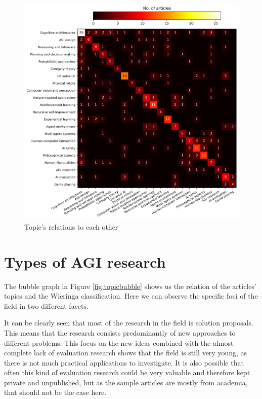 \documentclass[utf8,english]{gradu3}
\begin{document}
\begin{figure}[H]
  \centering
  \includegraphics[scale=0.65]{material/data/topic_heatmap_no_zeroes.png}
  \caption{Topic's relations to each other}
  \label{fig:topicheat}
\end{figure}


\section{Types of AGI research}

The bubble graph in Figure \ref{fig:topicbubble} shows us the relation of the
articles' topics and the Wieringa classification. Here we can observe the
specific foci of the field in two different facets.

It can be clearly seen that most of the research in the field is solution
proposals. This means that the research consists predominantly of new approaches
to different problems. This focus on the new ideas combined with the almost
complete lack of evaluation research shows that the field is still very young,
as there is not much practical applications to investigate. It is also possible
that often this kind of evaluation research could be very valuable and therefore
kept private and unpublished, but as the sample articles are mostly from
academia, that should not be the case here. 
\end{document}
